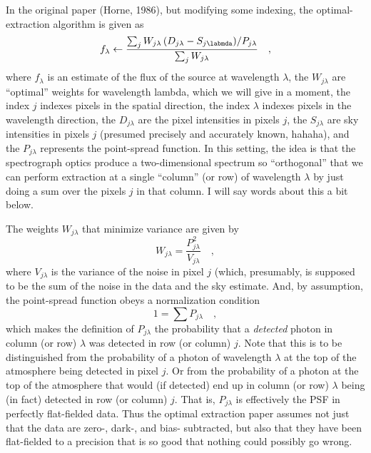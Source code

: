 \documentclass[12pt, letterpaper]{article}
\begin{document}
In the original paper (Horne, 1986), but modifying some indexing, the
optimal-extraction algorithm is given as
\begin{equation}
f_\lambda \leftarrow \frac{\sum_j W_{j\lambda}\,(D_{j\lambda} - S_{j\labmda}) / P_{j\lambda}}%
                          {\sum_j W_{j\lambda}}
\quad ,
\end{equation}
where $f_\lambda$ is an estimate of the flux of the source at
wavelength $\lambda$, the $W_{j\lambda}$ are ``optimal'' weights for
wavelength lambda, which we will give in a moment, the index $j$
indexes pixels in the spatial direction, the index $\lambda$ indexes
pixels in the wavelength direction, the $D_{j\lambda}$ are the pixel
intensities in pixels $j$, the $S_{j\lambda}$ are sky intensities in
pixels $j$ (presumed precisely and accurately known, hahaha), and the
$P_{j\lambda}$ represents the point-spread function.
In this setting, the idea is that the spectrograph optics produce a
two-dimensional spectrum so ``orthogonal'' that we can perform
extraction at a single ``column'' (or row) of wavelength $\lambda$ by
just doing a sum over the pixels $j$ in that column.
I will say words about this a bit below.

The weights $W_{j\lambda}$ that minimize variance are given by
\begin{equation}
W_{j\lambda} = \frac{P_{j\lambda}^2}{V_{j\lambda}}
\quad ,
\end{equation}
where $V_{j\lambda}$ is the variance of the noise in pixel $j$ (which,
presumably, is supposed to be the sum of the noise in the data and the
sky estimate.
And, by assumption, the point-spread function obeys a normalization
condition
\begin{equation}
1 = \sum P_{j\lambda}
\quad ,
\end{equation}
which makes the definition of $P_{j\lambda}$ the probability that a
\emph{detected} photon in column (or row) $\lambda$ was detected in
row (or column) $j$.
Note that this is to be distinguished from the probability of a photon
of wavelength $\lambda$ at the top of the atmosphere being detected in
pixel $j$.
Or from the probability of a photon at the top of the atmosphere that
would (if detected) end up in column (or row) $\lambda$ being (in
fact) detected in row (or column) $j$.
That is, $P_{j\lambda}$ is effectively the PSF in perfectly
flat-fielded data.
Thus the optimal extraction paper assumes not just that the data are
zero-, dark-, and bias- subtracted, but also that they have been
flat-fielded to a precision that is so good that nothing could
possibly go wrong.
\end{document}
